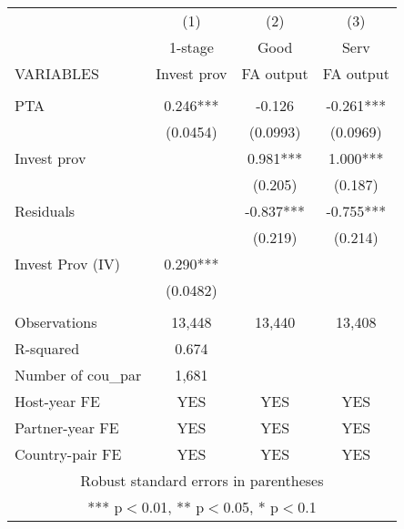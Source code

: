 \begin{tabular}{lccc} \hline
 & (1) & (2) & (3) \\
 & 1-stage & Good & Serv \\
VARIABLES & Invest prov & FA output & FA output \\ \hline
 &  &  &  \\
PTA & 0.246*** & -0.126 & -0.261*** \\
 & (0.0454) & (0.0993) & (0.0969) \\
Invest prov &  & 0.981*** & 1.000*** \\
 &  & (0.205) & (0.187) \\
Residuals &  & -0.837*** & -0.755*** \\
 &  & (0.219) & (0.214) \\
Invest Prov (IV) & 0.290*** &  &  \\
 & (0.0482) &  &  \\
 &  &  &  \\
Observations & 13,448 & 13,440 & 13,408 \\
R-squared & 0.674 &  &  \\
Number of cou\_par & 1,681 &  &  \\
Host-year FE & YES & YES & YES \\
Partner-year FE & YES & YES & YES \\
 Country-pair FE & YES & YES & YES \\ \hline
\multicolumn{4}{c}{ Robust standard errors in parentheses} \\
\multicolumn{4}{c}{ *** p$<$0.01, ** p$<$0.05, * p$<$0.1} \\
\end{tabular}
